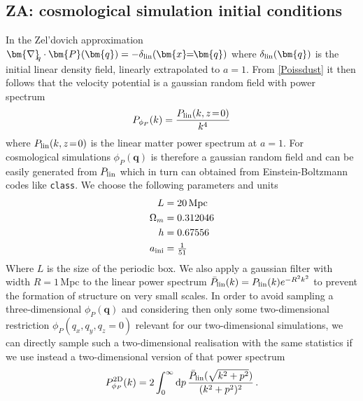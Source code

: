 \documentclass[twocolumn, nofootinbib, showpacs, superscriptaddress]{revtex4-1}
\renewcommand{\v}[1]{\bm{#1} }
\newcommand{\vq}[0]{\bm{q} }
\newcommand{\vnabla}[0]{\bm{\nabla} }
\begin{document}
\subsection{ZA: cosmological simulation initial conditions}\label{ZeldoCosmo}
In the Zel'dovich approximation $\vnabla_{\!\! q}\cdot\v{P}(\vq) = - \delta_{\rm lin} (\v{x}\!\!=\!\!\vq) $  where $\delta_{\rm lin} (\vq)$ is the initial linear density field, linearly extrapolated to $a=1$.
From \eqref{Poissdust} it then follows that the velocity potential is a gaussian random field with power spectrum
\begin{equation}
P_{\phi_P}(k)  = \frac{P_{\rm lin}(k,z\!=\!0)}{k^4}
  \end{equation}
where $P_{\rm lin}(k,z\!=\!0)$ is the linear matter power spectrum at $a=1$. For cosmological simulations $ \phi_P(\vq)$ is therefore a gaussian random field and can be easily generated from $P_{\rm lin}$ which in turn can obtained from Einstein-Boltzmann codes like \texttt{class}. We choose the following parameters and units
\begin{align}
L &= 20\, \rm{Mpc}\\
\Omega_m &= 0.312046 \\
h&=0.67556\\
a_{\rm ini} &=\tfrac{1}{51}
\end{align}
Where $L$ is the size of the periodic box. We also apply a gaussian filter with width $R=1\,$Mpc to the linear power spectrum $\bar P_{\rm lin}(k) =  P_{\rm lin}(k) e^{- R^2 k^2}$ to prevent the formation of structure on very small scales.
In order to avoid sampling a three-dimensional $\phi_{P}(\v{q})$ and considering then only some two-dimensional restriction $\phi_{P}(q_x,q_y,q_z\!=\!0)$ relevant for our two-dimensional simulations, we can directly sample such a two-dimensional realisation with the same statistics if we use instead a two-dimensional version of that power spectrum
\begin{equation}
P^{2\rm D}_{\phi_P}(k)  = 2 \int_0^\infty \mathrm{d} p\, \frac{\bar P_{\rm lin}(\sqrt{k^2+p^2})}{(k^2+p^2)^2} \,.
  \end{equation}
\end{document}
